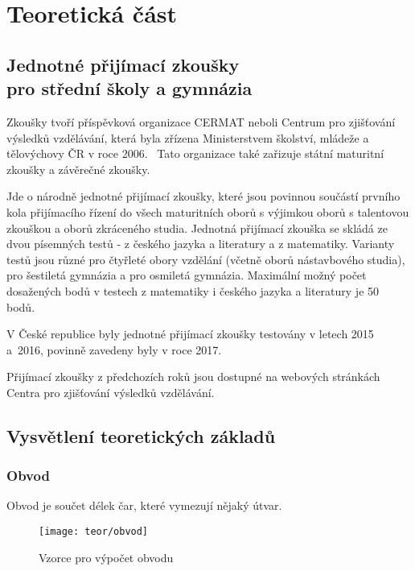 \chapter{Teoretická část}


\section[Jednotné přijímací zkoušky pro střední školy a gymnázia]{Jednotné přijímací zkoušky\\pro střední školy a gymnázia}

Zkoušky tvoří příspěvková organizace CERMAT neboli Centrum pro zjišťování výsledků vzdělávání, která byla zřízena Ministerstvem školství, mládeže a tělovýchovy ČR v roce 2006.~\cite{zakon_CERMAT} Tato organizace také zařizuje státní maturitní zkoušky a závěrečné zkoušky.~\cite{CERMAT_p_m}



Jde o národně jednotné přijímací zkoušky, které jsou povinnou součástí prvního kola přijímacího řízení do všech maturitních oborů s výjimkou oborů s talentovou zkouškou a oborů zkráceného studia.
Jednotná přijímací zkouška se skládá ze dvou písemných testů - z českého jazyka a literatury a z matematiky.
Varianty testů jsou různé pro čtyřleté obory vzdělání (včetně oborů nástavbového studia), pro šestiletá gymnázia a pro osmiletá gymnázia.
Maximální možný počet dosažených bodů v testech z matematiky i českého jazyka a literatury je 50 bodů.~\cite{CERMAT_co_to_je}

V České republice byly jednotné přijímací zkoušky testovány v letech 2015 a~2016, povinně zavedeny byly v roce 2017.~\cite{CERMAT_rocni_zprava}

Přijímací zkoušky z předchozích roků jsou dostupné na webových stránkách Centra pro zjišťování výsledků vzdělávání.~\cite{CERMAT_pdfka}


\section{Vysvětlení teoretických základů}

\subsection{Obvod}
Obvod je součet délek čar, které vymezují nějaký útvar.~\cite{umim_mat}

\begin{figure}[p]
    \caption{Vzorce pro výpočet obvodu~\cite{umim_mat}}
    \centering
    \texttt{[image: teor/obvod]}
\end{figure}


